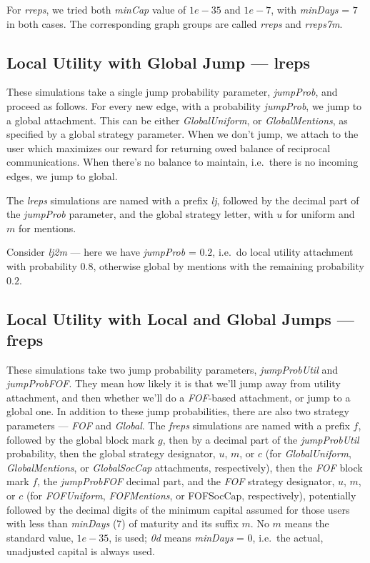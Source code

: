 \documentclass[10pt,oneside]{memoir}
\begin{document}
For {\itshape rreps}, we tried both {\itshape minCap} value of $1e-35$ and $1e-7$, with {\itshape minDays} = $7$ in both cases.  The corresponding graph groups are called {\itshape rreps} and {\itshape rreps7m}.


\subsection{Local Utility with Global Jump --- lreps}
\label{localutilitywithglobaljumplreps}

These simulations take a single jump probability parameter, {\itshape jumpProb}, and proceed as follows.  For every new edge, with a probability {\itshape jumpProb}, we jump to a global attachment.  This can be either {\itshape GlobalUniform}, or {\itshape GlobalMentions}, as specified by a global strategy parameter.  When we don't jump, we attach to the user which maximizes our reward for returning owed balance of reciprocal communications.  When there's no balance to maintain, i.e.\ there is no incoming edges, we jump to global.


The {\itshape lreps} simulations are named with a prefix {\itshape lj}, followed by the decimal part of the {\itshape jumpProb} parameter, and the global strategy letter, with $u$ for uniform and $m$ for mentions.


Consider {\itshape lj2m} --- here we have {\itshape jumpProb} = $0.2$, i.e.\ do local utility attachment with probability $0.8$, otherwise global by mentions with the remaining probability $0.2$.


\subsection{Local Utility with Local and Global Jumps --- freps}
\label{localutilitywithlocalandglobaljumpsfreps}

These simulations take two jump probability parameters, {\itshape jumpProbUtil} and {\itshape jumpProbFOF}.  They mean how likely it is that we'll jump away from utility attachment, and then whether we'll do a {\itshape FOF}-based attachment, or jump to a global one.  In addition to these jump probabilities, there are also two strategy parameters --- {\itshape FOF} and {\itshape Global}.
The {\itshape freps} simulations are named with a prefix $f$, followed by the global block mark $g$, then by a decimal part of the {\itshape jumpProbUtil} probability, then the global strategy designator, $u$, $m$, or $c$ (for {\itshape GlobalUniform}, {\itshape GlobalMentions}, or {\itshape GlobalSocCap} attachments, respectively), then the {\itshape FOF} block mark $f$, the {\itshape jumpProbFOF} decimal part, and the {\itshape FOF} strategy designator, $u$, $m$, or $c$ (for {\itshape FOFUniform}, {\itshape FOFMentions}, or FOFSocCap, respectively), potentially followed by the decimal digits of the minimum capital assumed for those users with less than {\itshape minDays} (7) of maturity and its suffix $m$.  No $m$ means the standard value, $1e-35$, is used; {\itshape 0d} means {\itshape minDays} = $0$, i.e.\ the actual, unadjusted capital is always used.
\end{document}
